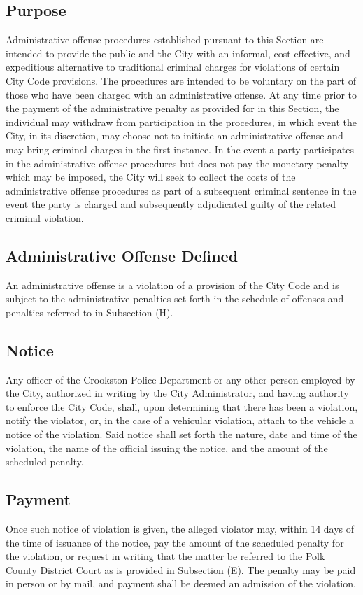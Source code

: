 \subsection{Purpose}
Administrative offense procedures established pursuant to this Section are intended to provide the public and the City with an informal, cost effective, and expeditious alternative to traditional criminal charges for violations of certain City Code provisions. The procedures are intended to be voluntary on the part of those who have been charged with an administrative offense. At any time prior to the payment of the administrative penalty as provided for in this Section, the individual may withdraw from participation in the procedures, in which event the City, in its discretion, may choose not to initiate an administrative offense and may bring criminal charges in the first instance. In the event a party participates in the administrative offense procedures but does not pay the monetary penalty which may be imposed, the City will seek to collect the costs of the administrative offense procedures as part of a subsequent criminal sentence in the event the party is charged and subsequently adjudicated guilty of the related criminal violation.
\subsection{Administrative Offense Defined}
An administrative offense is a violation of a provision of the City Code and is subject to the administrative penalties set forth in the schedule of offenses and penalties referred to in Subsection (H).
\subsection{Notice}
Any officer of the Crookston Police Department or any other person employed by the City, authorized in writing by the City Administrator, and having authority to enforce the City Code, shall, upon determining that there has been a violation, notify the violator, or, in the case of a vehicular violation, attach to the vehicle a notice of the violation. Said notice shall set forth the nature, date and time of the violation, the name of the official issuing the notice, and the amount of the scheduled penalty.
\subsection{Payment}
Once such notice of violation is given, the alleged violator may, within 14 days of the time of issuance of the notice, pay the amount of the scheduled penalty for the violation, or request in writing that the matter be referred to the Polk County District Court as is provided in Subsection (E). The penalty may be paid in person or by mail, and payment shall be deemed an admission of the violation.
